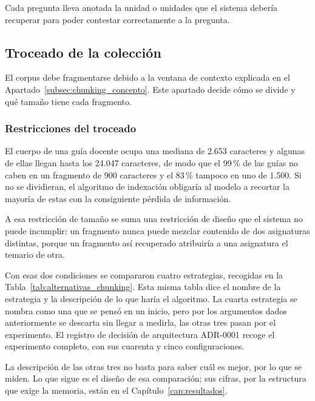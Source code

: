 

Cada pregunta lleva anotada la unidad o unidades que el sistema debería recuperar para poder contestar correctamente a la pregunta.

\subsection[Troceado de la colección]{Troceado de la colección}
\label{subsec:chunking}

El corpus debe fragmentarse debido a la ventana de contexto explicada en el Apartado~\ref{subsec:chunking_concepto}. Este apartado decide cómo se divide y qué tamaño tiene cada fragmento.

\subsubsection[Restricciones del troceado]{Restricciones del troceado}
\label{secc:troceado_restricciones}

El cuerpo de una guía docente ocupa una mediana de 2.653 caracteres y algunas de ellas llegan hasta los 24.047 caracteres, de modo que el 99\,\% de las guías no caben en un fragmento de 900 caracteres y el 83\,\% tampoco en uno de 1.500. Si no se dividieran, el algoritmo de indexación obligaría al modelo a recortar la mayoría de estas con la consiguiente pérdida de información.

A esa restricción de tamaño se suma una restricción de diseño que el sistema no puede incumplir:
un fragmento nunca puede mezclar contenido de dos asignaturas distintas, porque un fragmento así recuperado atribuiría a una asignatura el temario de otra.

Con esas dos condiciones se compararon cuatro estrategias, recogidas en la Tabla~\ref{tab:alternativas_chunking}. Esta misma tabla dice el nombre de la estrategia y la descripción de lo que haría el algoritmo. La cuarta estrategia se nombra como una que se pensó en un inicio, pero por los argumentos dados anteriormente se descarta sin llegar a medirla, las otras tres pasan por el experimento. El registro de decisión de arquitectura ADR-0001\cite{repo_tfg} recoge el
  experimento completo, con sus cuarenta y cinco configuraciones.



La descripción de las otras tres no basta para saber cuál es mejor, por lo que se miden. Lo que sigue es el diseño de esa comparación; sus cifras, por la estructura que exige la memoria, están en el Capítulo~\ref{cap:resultados}.


